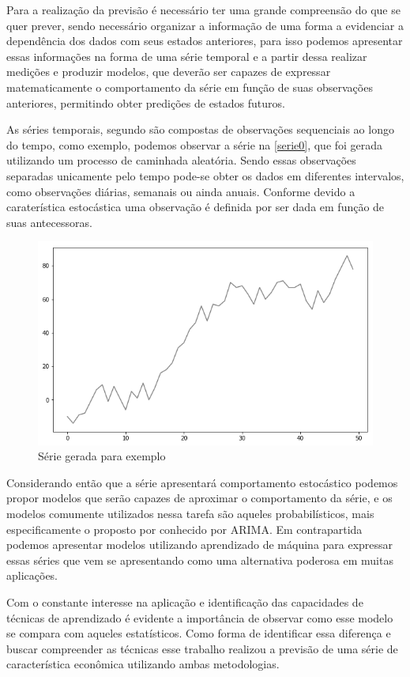 \documentclass[
    12pt,
    oneside,
    a4paper,
    english,
    brazil
]{abntex2}
\begin{document}
Para a realização da previsão é necessário ter uma grande compreensão do que se
quer prever, sendo necessário organizar a informação de uma forma a evidenciar
a dependência dos dados com seus estados anteriores, para isso podemos
apresentar essas informações na forma de uma série temporal e a partir dessa
realizar medições e produzir modelos, que deverão ser capazes de expressar
matematicamente o comportamento da série em função de suas observações
anteriores, permitindo obter predições de estados futuros.

As séries temporais, segundo  são compostas de observações
sequenciais ao longo do tempo, como exemplo, podemos observar a série na
\autoref{serie0}, que foi gerada utilizando um processo de caminhada aleatória.
Sendo essas observações separadas unicamente pelo tempo pode-se obter os dados
em diferentes intervalos, como observações diárias, semanais ou ainda anuais.
Conforme  devido a caraterística estocástica uma observação
é definida por ser dada em função de suas antecessoras.

\begin{figure}[ht]
    \centering
    \caption{Série gerada para exemplo}\label{serie0}
    \includegraphics[width=.6\linewidth]{images/serie_exemplo.png}
\end{figure}

Considerando então que a série apresentará comportamento estocástico podemos
propor modelos que serão capazes de aproximar o comportamento da série, e os
modelos comumente utilizados nessa tarefa são aqueles probabilísticos, mais
especificamente o proposto por  conhecido por ARIMA\@. Em
contrapartida podemos apresentar modelos utilizando aprendizado de máquina para
expressar essas séries que vem se apresentando como uma alternativa poderosa em
muitas aplicações.

Com o constante interesse na aplicação e identificação das capacidades de
técnicas de aprendizado é evidente a importância de observar como esse
modelo se compara com aqueles estatísticos. Como forma de identificar essa
diferença e buscar compreender as técnicas esse trabalho realizou a previsão de
uma série de característica econômica utilizando ambas metodologias.
\end{document}
